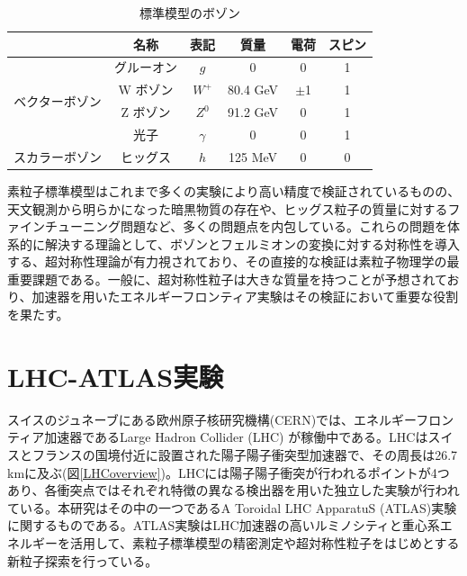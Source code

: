 \begin{table}[]
    \centering
    \caption[標準模型のボゾン]{標準模型のボゾン}
    \label{tab:bozon}

    \begin{tabular}{cccccc}
    \hline
                                                                                           & 名称        & 表記           & 質量                 & 電荷   & スピン \\ 
    \hline\hline
    \multicolumn{1}{c|}{\multirow{4}{*}{ベクターボゾン}}  & グルーオン       & $g$            & 0            & 0 & 1 \\
    \multicolumn{1}{c|}{}                                            &   W ボゾン     & $W^{+}$            & 80.4 GeV            & $\pm$1 & 1 \\ 
    \multicolumn{1}{c|}{}                       & Z ボゾン      & $Z^{0}$           & 91.2 GeV            & 0 & 1 \\
    \multicolumn{1}{c|}{}                                            & 光子    & $\gamma$            & 0             & 0 & 1 \\
    \hline\hline
    \multicolumn{1}{c|}{\multirow{1}{*}{スカラーボゾン}}  & ヒッグス  & $h$    & 125 MeV     & 0    & 0 \\
    \hline
    \end{tabular}
\end{table}


素粒子標準模型はこれまで多くの実験により高い精度で検証されているものの、天文観測から明らかになった暗黒物質の存在や、ヒッグス粒子の質量に対するファインチューニング問題など、多くの問題点を内包している。これらの問題を体系的に解決する理論として、ボゾンとフェルミオンの変換に対する対称性を導入する、超対称性理論が有力視されており、その直接的な検証は素粒子物理学の最重要課題である。一般に、超対称性粒子は大きな質量を持つことが予想されており、加速器を用いたエネルギーフロンティア実験はその検証において重要な役割を果たす。
\section{LHC-ATLAS実験}
\label{sec_intro_atlas}

スイスのジュネーブにある欧州原子核研究機構(CERN)では、エネルギーフロンティア加速器であるLarge Hadron Collider (LHC) が稼働中である。LHCはスイスとフランスの国境付近に設置された陽子陽子衝突型加速器で、その周長は26.7 kmに及ぶ(図\ref{LHCoverview})。LHCには陽子陽子衝突が行われるポイントが4つあり、各衝突点ではそれぞれ特徴の異なる検出器を用いた独立した実験が行われている。本研究はその中の一つであるA Toroidal LHC ApparatuS (ATLAS)実験に関するものである。ATLAS実験はLHC加速器の高いルミノシティと重心系エネルギーを活用して、素粒子標準模型の精密測定や超対称性粒子をはじめとする新粒子探索を行っている。

